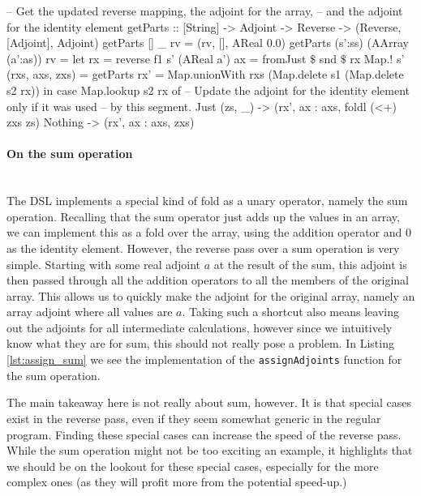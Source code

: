 \begin{haskell}[caption=Reverse pass over a vectorized fold, label=lst:assign_foldv, gobble=16]
                        -- Get the updated reverse mapping, the adjoint for the array,
                        -- and the adjoint for the identity element
                        getParts :: [String] -> Adjoint -> Reverse 
                            -> (Reverse, [Adjoint], Adjoint)
                        getParts []      _                rv = (rv, [], AReal 0.0)
                        getParts (s':ss) (AArray (a':as)) rv =
                            let rx = reverse f1 s' (AReal a')
                                ax = fromJust $\$$ snd $\$$ rx Map.! s'
                                (rxs, axs, zxs) = getParts
                                rx' = Map.unionWith rxs (Map.delete s1 (Map.delete s2 rx))
                            in  case Map.lookup s2 rx of
                                -- Update the adjoint for the identity element only if it was used
                                -- by this segment.
                                Just (zs, _) -> (rx', ax : axs, foldl (<+) zxs zs)
                                Nothing      -> (rx', ax : axs, zxs)
            \end{haskell}

            \paragraph{On the sum operation}\mbox{}\\
                The DSL implements a special kind of fold as a unary operator, namely the sum operation.
                Recalling that the sum operator just adds up the values in an array, we can implement this as a fold over the array, using the addition operator and $0$ as the identity element.
                However, the reverse pass over a sum operation is very simple.
                Starting with some real adjoint $a$ at the result of the sum, this adjoint is then passed through all the addition operators to all the members of the original array.
                This allows us to quickly make the adjoint for the original array, namely an array adjoint where all values are $a$.
                Taking such a shortcut also means leaving out the adjoints for all intermediate calculations, however since we intuitively know what they are for sum, this should not really pose a problem.
                In Listing \ref{lst:assign_sum} we see the implementation of the \texttt{assignAdjoints} function for the sum operation.

                The main takeaway here is not really about sum, however.
                It is that special cases exist in the reverse pass, even if they seem somewhat generic in the regular program.
                Finding these special cases can increase the speed of the reverse pass.
                While the sum operation might not be too exciting an example, it highlights that we should be on the lookout for these special cases, especially for the more complex ones (as they will profit more from the potential speed-up.)

